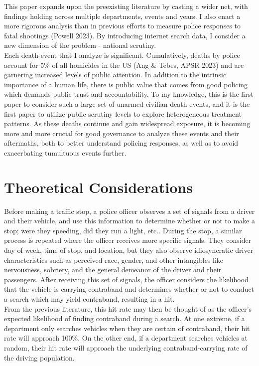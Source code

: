 \documentclass[12pt,a4paper]{article}
\begin{document}
This paper expands upon the preexisting literature by casting a wider net, with findings holding across multiple departments, events and years. I also enact a more rigorous analysis than in previous efforts to measure police responses to fatal shootings (Powell 2023). By introducing internet search data, I consider a new dimension of the problem - national scrutiny.  \\

Each death-event that I analyze is significant. Cumulatively, deaths by police account for 5\% of all homicides in the US (Ang \& Tebes, APSR 2023) and are garnering increased levels of public attention. In addition to the intrinsic importance of a human life, there is public value that comes from good policing which demands public trust and accountability. To my knowledge, this is the first paper to consider such a large set of unarmed civilian death events, and it is the first paper to utilize public scrutiny levels to explore heterogeneous treatment patterns. As these deaths continue and gain widespread exposure, it is becoming more and more crucial for good governance to analyze these events and their aftermaths, both to better understand policing responses, as well as to avoid exacerbating tumultuous events further. 

\section{Theoretical Considerations} 
Before making a traffic stop, a police officer observes a set of signals from a driver and their vehicle, and use this information to determine whether or not to make a stop; were they speeding, did they run a light, etc.. During the stop, a similar process is repeated where the officer receives more specific signals. They consider day of week, time of stop, and location, but they also observe idiosyncratic driver characteristics such as perceived race, gender, and other intangibles like nervousness, sobriety, and the general demeanor of the driver and their passengers. After receiving this set of signals, the officer considers the likelihood that the vehicle is carrying contraband and determines whether or not to conduct a search which may yield contraband, resulting in a hit. \\

From the previous literature, this hit rate may then be thought of as the officer's expected likelihood of finding contraband during a search. At one extreme, if a department only searches vehicles when they are certain of contraband, their hit rate will approach 100\%. On the other end, if a department searches vehicles at random, their hit rate will approach the underlying contraband-carrying rate of the driving population. \\
\end{document}
